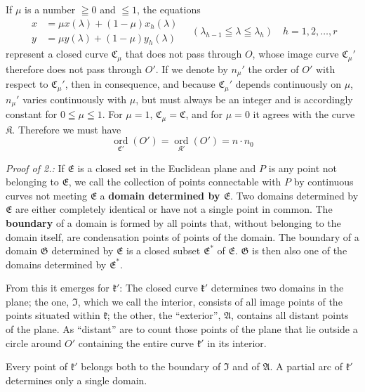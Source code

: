 \documentclass{article}
\begin{document}
If $\mu$ is a number $\geqq 0$ and $\leqq 1$, the equations
\[ \begin{aligned} x &= \mu x(\lambda) + (1 - \mu) x_h(\lambda) \\ y &= \mu y(\lambda) + (1 - \mu) y_h(\lambda) \end{aligned} \quad (\lambda_{h-1} \leqq \lambda \leqq \lambda_h) \quad h = 1, 2, \dots, r \]
represent a closed curve $\mathfrak{C}_\mu$ that does not pass through $O$, whose image curve $\mathfrak{C}_\mu'$ therefore does not pass through $O'$. If we denote by $n_\mu'$ the order of $O'$ with respect to $\mathfrak{C}_\mu'$, then in consequence, and because $\mathfrak{C}_\mu'$ depends continuously on $\mu$, $n_\mu'$ varies continuously with $\mu$, but must always be an integer and is accordingly constant for $0 \leqq \mu \leqq 1$. For $\mu = 1$, $\mathfrak{C}_\mu = \mathfrak{C}$, and for $\mu = 0$ it agrees with the curve $\mathfrak{K}$. Therefore we must have
\[ \underset{\mathfrak{C}'}{\operatorname{ord}}(O') = \underset{\mathfrak{K}'}{\operatorname{ord}}(O') = n \cdot n_0 \]

\emph{Proof of 2.:} If $\mathfrak{E}$ is a closed set in the Euclidean plane and $P$ is any point not belonging to $\mathfrak{E}$, we call the collection of points connectable with $P$ by continuous curves not meeting $\mathfrak{E}$ a \textbf{domain determined by $\mathfrak{E}$}. Two domains determined by $\mathfrak{E}$ are either completely identical or have not a single point in common. The \textbf{boundary} of a domain is formed by all points that, without belonging to the domain itself, are condensation points of points of the domain. The boundary of a domain $\mathfrak{G}$ determined by $\mathfrak{E}$ is a closed subset $\mathfrak{E}^*$ of $\mathfrak{E}$. $\mathfrak{G}$ is then also one of the domains determined by $\mathfrak{E}^*$.

From this it emerges for $\mathfrak{k}'$: The closed curve $\mathfrak{k}'$ determines two domains in the plane; the one, $\mathfrak{I}$, which we call the interior, consists of all image points of the points situated within $\mathfrak{k}$; the other, the ``exterior'', $\mathfrak{A}$, contains all distant points of the plane. As ``distant'' are to count those points of the plane that lie outside a circle around $O'$ containing the entire curve $\mathfrak{k}'$ in its interior.

Every point of $\mathfrak{k}'$ belongs both to the boundary of $\mathfrak{I}$ and of $\mathfrak{A}$. A partial arc of $\mathfrak{k}'$ determines only a single domain.
\end{document}
